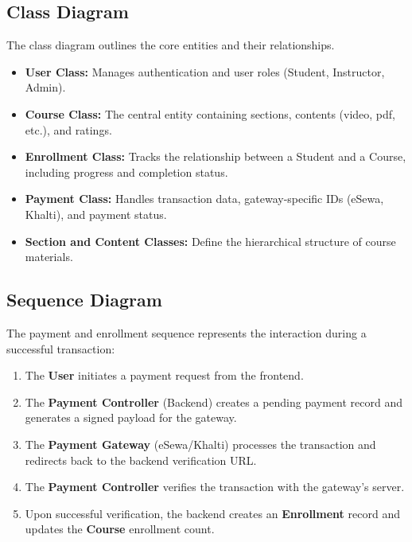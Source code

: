\subsection{Class Diagram}
The class diagram outlines the core entities and their relationships.
\begin{itemize}
    \item \textbf{User Class:} Manages authentication and user roles (Student, Instructor, Admin).
    \item \textbf{Course Class:} The central entity containing sections, contents (video, pdf, etc.), and ratings.
    \item \textbf{Enrollment Class:} Tracks the relationship between a Student and a Course, including progress and completion status.
    \item \textbf{Payment Class:} Handles transaction data, gateway-specific IDs (eSewa, Khalti), and payment status.
    \item \textbf{Section and Content Classes:} Define the hierarchical structure of course materials.
\end{itemize}

\subsection{Sequence Diagram}
The payment and enrollment sequence represents the interaction during a successful transaction:
\begin{enumerate}
    \item The \textbf{User} initiates a payment request from the frontend.
    \item The \textbf{Payment Controller} (Backend) creates a pending payment record and generates a signed payload for the gateway.
    \item The \textbf{Payment Gateway} (eSewa/Khalti) processes the transaction and redirects back to the backend verification URL.
    \item The \textbf{Payment Controller} verifies the transaction with the gateway's server.
    \item Upon successful verification, the backend creates an \textbf{Enrollment} record and updates the \textbf{Course} enrollment count.
\end{enumerate}

